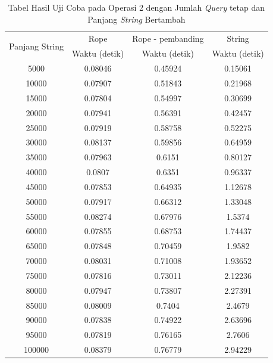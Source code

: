 \begin{appendices}
  \begin{table}[h]
  \centering
	  \begin{tabular}{|c|c|c|c|}
		  \hline
		  \multirow{2}{*}{Panjang String} & Rope & Rope - pembanding & String\\
		  		  & Waktu (detik) & Waktu (detik) & Waktu (detik)\\ \hline
		  5000	& 0.08046	& 0.45924	& 0.15061\\ \hline
		  10000	& 0.07907	& 0.51843	& 0.21968\\ \hline
		  15000	& 0.07804	& 0.54997	& 0.30699\\ \hline
		  20000	& 0.07941	& 0.56391	& 0.42457\\ \hline
		  25000	& 0.07919	& 0.58758	& 0.52275\\ \hline
		  30000	& 0.08137	& 0.59856	& 0.64959\\ \hline
		  35000	& 0.07963	& 0.6151	& 0.80127\\ \hline
		  40000	& 0.0807	& 0.6351	& 0.96337\\ \hline
		  45000	& 0.07853	& 0.64935	& 1.12678\\ \hline
		  50000	& 0.07917	& 0.66312	& 1.33048\\ \hline
		  55000	& 0.08274	& 0.67976	& 1.5374\\ \hline
		  60000	& 0.07855	& 0.68753	& 1.74437\\ \hline
		  65000	& 0.07848	& 0.70459	& 1.9582\\ \hline
		  70000	& 0.08031	& 0.71008	& 1.93652\\ \hline
		  75000	& 0.07816	& 0.73011	& 2.12236\\ \hline
		  80000	& 0.07947	& 0.73807	& 2.27391\\ \hline
		  85000	& 0.08009	& 0.7404	& 2.4679\\ \hline
		  90000	& 0.07838	& 0.74922	& 2.63696\\ \hline
		  95000	& 0.07819	& 0.76165	& 2.7606\\ \hline
		  100000	& 0.08379	& 0.76779	& 2.94229\\ \hline
	  \end{tabular}\caption{Tabel Hasil Uji Coba pada Operasi 2 dengan Jumlah \textit{Query} tetap dan Panjang \textit{String} Bertambah}
	  \label{tab:operasi2string}
  \end{table}
  

\end{appendices}
